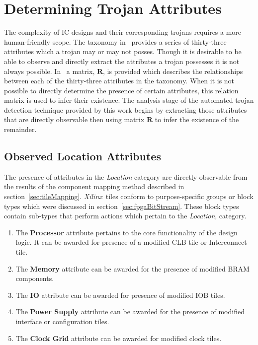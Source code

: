 \documentclass[conference]{IEEEtran}
\newcommand{\Xilinx}{\textit{\gls{Xilinx}}~}
\begin{document}
\section{Determining Trojan Attributes} \label{sec:trojanAttributes}
The complexity of \acrlong{IC} designs and their corresponding trojans requires a more human-friendly scope.
The taxonomy in~\cite{samerAttribute} provides a series of thirty-three attributes which a trojan may or may not posses.
Though it is desirable to be able to observe and directly extract the attributes a trojan possesses it is not always possible. 
In~\cite{samerAttribute} a matrix, $\mathbf{R}$, is provided which describes the relationships between each of the thirty-three attributes in the taxonomy.
When it is not possible to directly determine the presence of certain attributes, this relation matrix is used to infer their existence.
The analysis stage of the automated trojan detection technique provided by this work begins by extracting those attributes that are directly observable then using matrix $\mathbf{R}$ to infer the existence of the remainder. 
\subsection{Observed Location Attributes}
The presence of attributes in the \textit{Location} category are directly observable from the results of the component mapping method described in section~\ref{sec:tileMapping}.
\Xilinx tiles conform to purpose-specific groups or block types which were discussed in section~\ref{sec:fpgaBitStream}.
These block types contain sub-types that perform actions which pertain to the \textit{Location}, category. 
\begin{enumerate}
	\item The \textbf{Processor} attribute pertains to the core functionality of the design logic. It can be awarded for presence of a modified \acrshort{CLB} tile or Interconnect tile.
	\item The \textbf{Memory} attribute can be awarded for the presence of modified \acrshort{BRAM} components.
	\item The \textbf{\acrshort{IO}} attribute can be awarded for presence of modified \acrshort{IOB} tiles.
	\item The \textbf{Power Supply} attribute can be awarded for the presence of modified interface or configuration tiles.
	\item The \textbf{Clock Grid} attribute can be awarded for modified clock tiles.
\end{enumerate}
\end{document}
